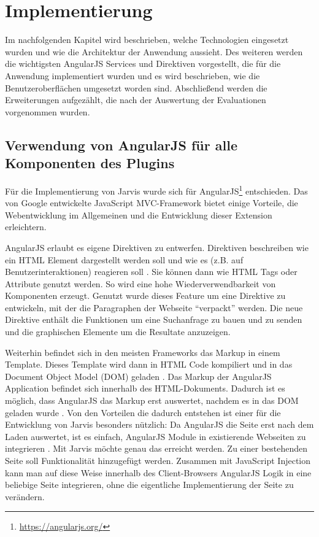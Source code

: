 \section{Implementierung}
Im nachfolgenden Kapitel wird beschrieben, welche Technologien eingesetzt wurden und wie die Architektur der Anwendung aussieht. Des weiteren werden die wichtigsten AngularJS Services und Direktiven vorgestellt, die für die Anwendung implementiert wurden und es wird beschrieben, wie die Benutzeroberflächen umgesetzt worden sind. Abschließend werden die Erweiterungen aufgezählt, die nach der Auswertung der Evaluationen vorgenommen wurden.

 \subsection{Verwendung von AngularJS für alle Komponenten des Plugins}
 Für die Implementierung von Jarvis wurde sich für AngularJS\footnote{\url{https://angularjs.org/}} entschieden. Das von Google entwickelte JavaScript MVC-Framework bietet einige Vorteile, die Webentwicklung im Allgemeinen und die Entwicklung dieser Extension erleichtern.

 AngularJS erlaubt es eigene Direktiven zu entwerfen. Direktiven beschreiben wie ein HTML Element dargestellt werden soll und wie es (z.B. auf Benutzerinteraktionen) reagieren soll \cite{jain2015angularjs}. Sie können dann wie HTML Tags oder Attribute genutzt werden. So wird eine hohe Wiederverwendbarkeit von Komponenten erzeugt. Genutzt wurde dieses Feature um eine Direktive zu entwickeln, mit der die Paragraphen der Webseite ``verpackt'' werden. Die neue Direktive enthält die Funktionen um eine Suchanfrage zu bauen und zu senden und die graphischen Elemente um die Resultate anzuzeigen. 

 Weiterhin befindet sich in den meisten Frameworks das Markup in einem Template. Dieses Template wird dann in HTML Code kompiliert und in das Document Object Model (DOM) geladen \cite{jain2015angularjs}. Das Markup der AngularJS Application befindet sich innerhalb des HTML-Dokuments. Dadurch ist es möglich, dass AngularJS das Markup erst auswertet, nachdem es in das DOM geladen wurde \cite{jain2015angularjs}. Von den Vorteilen die dadurch entstehen ist einer für die Entwicklung von Jarvis besonders nützlich: Da AngularJS die Seite erst nach dem Laden auswertet, ist es einfach, AngularJS Module in existierende Webseiten zu integrieren \cite{jain2015angularjs}. Mit Jarvis möchte genau das erreicht werden. Zu einer bestehenden Seite soll Funktionalität hinzugefügt werden. Zusammen mit JavaScript Injection kann man auf diese Weise innerhalb des Client-Browsers AngularJS Logik in eine beliebige Seite integrieren, ohne die eigentliche Implementierung der Seite zu verändern.

